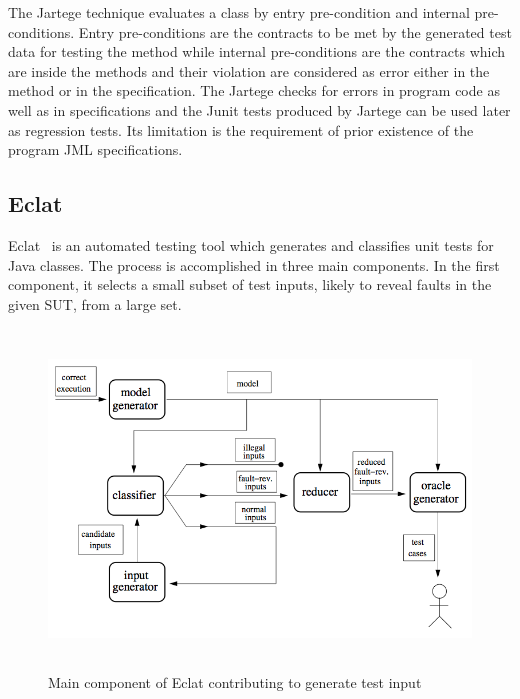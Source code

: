 \noindent The Jartege technique evaluates a class by entry pre-condition and internal pre-conditions. Entry pre-conditions are the contracts to be met by the generated test data for testing the method while internal pre-conditions are the contracts which are inside the methods and their violation are considered as error either in the method or in the specification. The Jartege checks for errors in program code as well as in specifications and the Junit tests produced by Jartege can be used later as regression tests. Its limitation is the requirement of prior existence of the program JML specifications.

\subsection{Eclat}
Eclat~\cite{Pacheco2005} is an automated testing tool which generates and classifies unit tests for Java classes. The process is accomplished in three main components. In the first component, it selects a small subset of test inputs, likely to reveal faults in the given SUT, from a large set.

\begin{figure}[h]
	\centering
	\includegraphics[width=15cm, height=9cm]{chapter3/eclat_working.png}
	\caption{Main component of Eclat contributing to generate test input~\cite{Pacheco2005}}
	\label{fig:eclat}
\end{figure}


